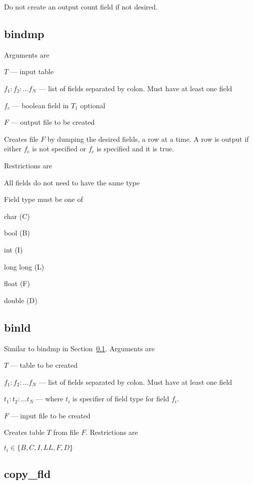 Do not create an output count field if not desired. %

\subsection{bindmp}
\label{bindmp}
Arguments are
\be
\item \(T\) --- input table
\item \(f_1:f_2:\ldots f_N\) --- list of fields separated by colon. Must
have at least one field
\item \(f_c\) --- boolean field in \(T_1\) optional
\item \(F\) --- output file to be created
\ee

Creates file \(F\) by dumping the desired fields, a row at a time. A
row is output if either \(f_c\) is not specified or \(f_c\) is specified
and it is true. 

Restrictions are
\be
\item All fields do not need to have the same type 
\item Field type must be one of 
\be
\item char (C)
\item bool (B)
\item int (I)
\item long long (L)
\item float (F)
\item double (D)
\ee
\ee

\subsection{binld}
\label{binld}
Similar to bindmp in Section~\ref{bindmp}.
Arguments are
\be
\item \(T\) --- table to be created
\item \(f_1:f_2:\ldots f_N\) --- list of fields separated by colon. Must
have at least one field
\item \(t_1:t_2:\ldots t_N\) --- where \(t_i\) is specifier of field
type for field \(f_i\). 
\item \(F\) --- input file to be created
\ee

Creates table \(T\) from file \(F\). Restrictions are 
\be
\item \(t_i \in \{B, C, I, LL, F, D\}\)
\ee

\subsection{copy\_fld}
\label{copy_fld}

